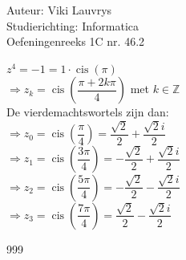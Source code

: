 \documentclass[a4paper]{article}
\begin{document}
  
\noindent \large Auteur: Viki Lauvrys        \\
\noindent \large Studierichting: Informatica \\
\noindent \large Oefeningenreeks 1C nr. 46.2 \\

\medskip

\normalsize

$ z^4 = -1 = 1 \cdot \operatorname{cis}(\pi) $\\

$ \Rightarrow z_k = \operatorname{cis}\left( \dfrac{\pi + 2k\pi}{4} \right) $ met $ k \in \mathbb{Z} $ \\

De vierdemachtswortels zijn dan: \\

$ \Rightarrow z_0 = \operatorname{cis}\left( \dfrac{\pi}{4} \right) = \dfrac{\sqrt{2}}{2} + \dfrac{\sqrt{2}i}{2} $  \\

$ \Rightarrow z_1 = \operatorname{cis}\left( \dfrac{3\pi}{4} \right) = -\dfrac{\sqrt{2}}{2} + \dfrac{\sqrt{2}i}{2} $  \\

$ \Rightarrow z_2 = \operatorname{cis}\left( \dfrac{5\pi}{4} \right) = -\dfrac{\sqrt{2}}{2} - \dfrac{\sqrt{2}i}{2} $  \\

$ \Rightarrow z_3 = \operatorname{cis}\left( \dfrac{7\pi}{4} \right) = \dfrac{\sqrt{2}}{2} - \dfrac{\sqrt{2}i}{2} $  \\

\begin{thebibliography}{999}
\end{thebibliography}
\end{document}
